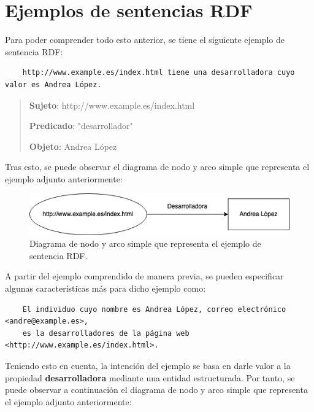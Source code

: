 \documentclass[11pt]{report}
\begin{document}
\section{Ejemplos de sentencias RDF}
Para poder comprender todo esto anterior, se tiene el siguiente ejemplo de sentencia RDF:

\begin{verbatim}
	http://www.example.es/index.html tiene una desarrolladora cuyo valor es Andrea López.
\end{verbatim}

\begin{quote}
	\textbf{Sujeto}: http://www.example.es/index.html

	\textbf{Predicado}: "desarrollador"

	\textbf{Objeto}: Andrea López
\end{quote}

Tras esto, se puede observar el diagrama de nodo y arco simple que representa el ejemplo adjunto anteriormente:

\begin{figure}[H]
	\centering
	\includegraphics[scale=0.7]{../img/Diagrama-Nodo-Arco.png}
	\caption{Diagrama de nodo y arco simple que representa el ejemplo de sentencia RDF.}
	\label{fig:Diagrama-Nodo-Arco}
\end{figure}


A partir del ejemplo comprendido de manera previa, se pueden especificar algunas características más para dicho ejemplo como:

\begin{verbatim}
	El individuo cuyo nombre es Andrea López, correo electrónico <andre@example.es>, 
	es la desarrolladores de la página web <http://www.example.es/index.html>.
\end{verbatim}

Teniendo esto en cuenta, la intención del ejemplo se basa en darle valor a la propiedad \textbf{desarrolladora} mediante una entidad estructurada. Por tanto, se puede observar a continuación el diagrama de nodo y arco simple que representa el ejemplo adjunto anteriormente:
\end{document}
